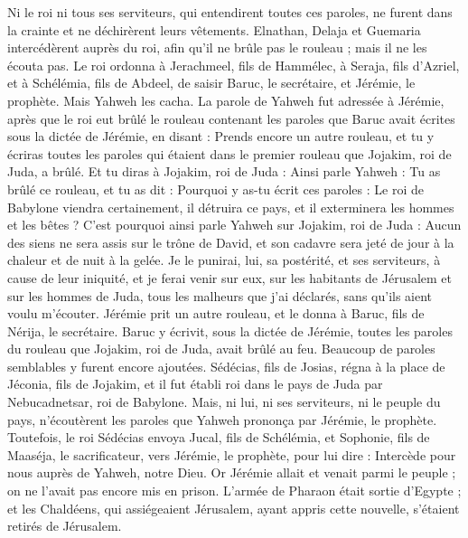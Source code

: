 \begin{multicols}{2}
Ni le roi ni tous ses serviteurs, qui entendirent toutes ces paroles, ne furent dans la crainte et ne déchirèrent leurs vêtements.
Elnathan, Delaja et Guemaria intercédèrent auprès du roi, afin qu'il ne brûle pas le rouleau ; mais il ne les écouta pas.
Le roi ordonna à Jerachmeel, fils de Hammélec, à Seraja, fils d'Azriel, et à Schélémia, fils de Abdeel, de saisir Baruc, le secrétaire, et Jérémie, le prophète. Mais Yahweh les cacha.
La parole de Yahweh fut adressée à Jérémie, après que le roi eut brûlé le rouleau contenant les paroles que Baruc avait écrites sous la dictée de Jérémie, en disant :
Prends encore un autre rouleau, et tu y écriras toutes les paroles qui étaient dans le premier rouleau que Jojakim, roi de Juda, a brûlé.
Et tu diras à Jojakim, roi de Juda : Ainsi parle Yahweh : Tu as brûlé ce rouleau, et tu as dit : Pourquoi y as-tu écrit ces paroles : Le roi de Babylone viendra certainement, il détruira ce pays, et il exterminera les hommes et les bêtes ?
C'est pourquoi ainsi parle Yahweh sur Jojakim, roi de Juda : Aucun des siens ne sera assis sur le trône de David, et son cadavre sera jeté de jour à la chaleur et de nuit à la gelée.
Je le punirai, lui, sa postérité, et ses serviteurs, à cause de leur iniquité, et je ferai venir sur eux, sur les habitants de Jérusalem et sur les hommes de Juda, tous les malheurs que j'ai déclarés, sans qu'ils aient voulu m'écouter.
Jérémie prit un autre rouleau, et le donna à Baruc, fils de Nérija, le secrétaire. Baruc y écrivit, sous la dictée de Jérémie, toutes les paroles du rouleau que Jojakim, roi de Juda, avait brûlé au feu. Beaucoup de paroles semblables y furent encore ajoutées.
\VerseOne{}Sédécias, fils de Josias, régna à la place de Jéconia, fils de Jojakim, et il fut établi roi dans le pays de Juda par Nebucadnetsar, roi de Babylone.
Mais, ni lui, ni ses serviteurs, ni le peuple du pays, n'écoutèrent les paroles que Yahweh prononça par Jérémie, le prophète.
Toutefois, le roi Sédécias envoya Jucal, fils de Schélémia, et Sophonie, fils de Maaséja, le sacrificateur, vers Jérémie, le prophète, pour lui dire : Intercède pour nous auprès de Yahweh, notre Dieu.
Or Jérémie allait et venait parmi le peuple ; on ne l'avait pas encore mis en prison.
L'armée de Pharaon était sortie d'Egypte ; et les Chaldéens, qui assiégeaient Jérusalem, ayant appris cette nouvelle, s'étaient retirés de Jérusalem.

\end{multicols}
